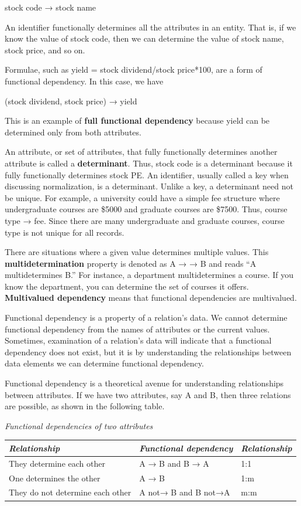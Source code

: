 \documentclass[
]{article}
\begin{document}
stock code → stock name

An identifier functionally determines all the attributes in an entity.
That is, if we know the value of stock code, then we can determine the
value of stock name, stock price, and so on.

Formulae, such as yield = stock dividend/stock price*100, are a form of
functional dependency. In this case, we have

(stock dividend, stock price) → yield

This is an example of \textbf{full functional dependency} because yield can
be determined only from both attributes.

An attribute, or set of attributes, that fully functionally determines
another attribute is called a \textbf{determinant}. Thus, stock code is a
determinant because it fully functionally determines stock PE. An
identifier, usually called a key when discussing normalization, is a
determinant. Unlike a key, a determinant need not be unique. For
example, a university could have a simple fee structure where
undergraduate courses are \$5000 and graduate courses are \$7500. Thus,
course type → fee. Since there are many undergraduate and graduate
courses, course type is not unique for all records.

There are situations where a given value determines multiple values.
This \textbf{multidetermination} property is denoted as A → → B and reads ``A
multidetermines B.'' For instance, a department multidetermines a course.
If you know the department, you can determine the set of courses it
offers. \textbf{Multivalued dependency} means that functional dependencies
are multivalued.

Functional dependency is a property of a relation's data. We cannot
determine functional dependency from the names of attributes or the
current values. Sometimes, examination of a relation's data will
indicate that a functional dependency does not exist, but it is by
understanding the relationships between data elements we can determine
functional dependency.

Functional dependency is a theoretical avenue for understanding
relationships between attributes. If we have two attributes, say A and
B, then three relations are possible, as shown in the following table.

\emph{Functional dependencies of two attributes}

\begin{longtable}[]{@{}lll@{}}
\toprule
\textbf{\emph{Relationship}} & \textbf{\emph{Functional dependency}} & \textbf{\emph{Relationship}} \\
\midrule
\endhead
They determine each other & A → B and B → A & 1:1 \\
One determines the other & A → B & 1:m \\
They do not determine each other & A not→ B and B not→A & m:m \\
\bottomrule
\end{longtable}
\end{document}
